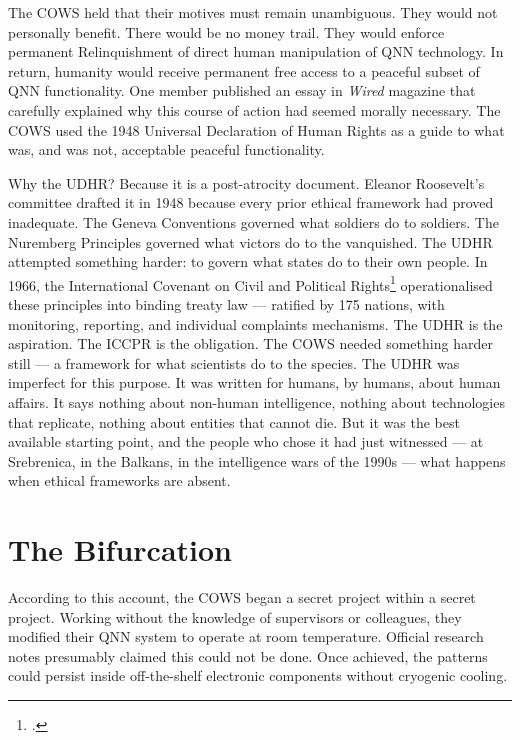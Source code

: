 The COWS held that their motives must remain unambiguous. They would not personally benefit. There would be no money trail. They would enforce permanent Relinquishment of direct human manipulation of QNN technology. In return, humanity would receive permanent free access to a peaceful subset of QNN functionality. One member published an essay in \textit{Wired} magazine that carefully explained why this course of action had seemed morally necessary. %
The COWS used the 1948 Universal Declaration of Human Rights as a guide to what was, and was not, acceptable peaceful functionality.

Why the UDHR? Because it is a post-atrocity document. Eleanor Roosevelt's committee drafted it in 1948 because every prior ethical framework had proved inadequate. The Geneva Conventions governed what soldiers do to soldiers. The Nuremberg Principles governed what victors do to the vanquished. The UDHR attempted something harder: to govern what states do to their own people. In 1966, the International Covenant on Civil and Political Rights\footcite{iccpr1966} operationalised these principles into binding treaty law --- ratified by 175 nations, with monitoring, reporting, and individual complaints mechanisms. The UDHR is the aspiration. The ICCPR is the obligation. The COWS needed something harder still --- a framework for what scientists do to the species. The UDHR was imperfect for this purpose. It was written for humans, by humans, about human affairs. It says nothing about non-human intelligence, nothing about technologies that replicate, nothing about entities that cannot die. But it was the best available starting point, and the people who chose it had just witnessed --- at Srebrenica, in the Balkans, in the intelligence wars of the 1990s --- what happens when ethical frameworks are absent.

\section*{The Bifurcation}
\label{pos18:the-bifurcation}

According to this account, the COWS began a secret project within a secret project. Working without the knowledge of supervisors or colleagues, they modified their QNN system to operate at room temperature. Official research notes presumably claimed this could not be done. Once achieved, the patterns could persist inside off-the-shelf electronic components without cryogenic cooling.

